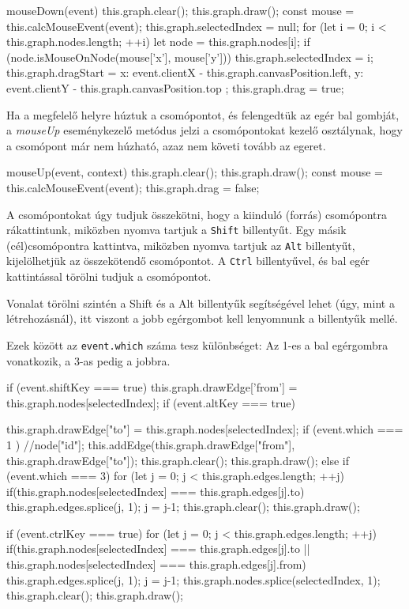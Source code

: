\begin{javascript}
mouseDown(event)
{
   this.graph.clear();
   this.graph.draw();
   const mouse = this.calcMouseEvent(event);
   this.graph.selectedIndex = null;
   for (let i = 0; i < this.graph.nodes.length; ++i) {
       let node = this.graph.nodes[i];
       if (node.isMouseOnNode(mouse['x'], mouse['y'])){
           this.graph.selectedIndex = i;
       }
   }
   this.graph.dragStart = {
       x: event.clientX - this.graph.canvasPosition.left,
       y: event.clientY - this.graph.canvasPosition.top
   };
   this.graph.drag = true;
}
\end{javascript}

 
Ha a megfelelő helyre húztuk a csomópontot, és felengedtük az egér bal gombját, a \textit{mouseUp} eseménykezelő metódus jelzi a csomópontokat kezelő osztálynak, hogy a csomópont már nem húzható, azaz nem követi tovább az egeret.

\begin{javascript}
mouseUp(event, context)
{
   this.graph.clear();
   this.graph.draw();
   const mouse = this.calcMouseEvent(event);
   this.graph.drag = false;
}
\end{javascript}

A csomópontokat úgy tudjuk összekötni, hogy a kiinduló (forrás) csomópontra rákattintunk, miközben nyomva tartjuk a \texttt{Shift} billentyűt. Egy másik (cél)csomópontra kattintva, miközben nyomva tartjuk az \texttt{Alt} billentyűt, kijelölhetjük az összekötendő csomópontot. A \texttt{Ctrl} billentyűvel, és bal egér kattintással törölni tudjuk a csomópontot.

Vonalat törölni szintén a Shift és a Alt billentyűk segítségével lehet (úgy, mint a létrehozásnál), itt viszont a jobb egérgombot kell lenyomnunk a billentyűk mellé.

Ezek között az \texttt{event.which} száma tesz különbséget: Az 1-es a bal egérgombra vonatkozik, a 3-as pedig a jobbra.

\begin{javascript}
if (event.shiftKey === true) {
    this.graph.drawEdge['from'] = this.graph.nodes[selectedIndex];
}
if (event.altKey === true) {
    this.graph.drawEdge["to"] = this.graph.nodes[selectedIndex];
    if (event.which === 1 ){
        //node["id"];
        this.addEdge(this.graph.drawEdge["from"], this.graph.drawEdge["to"]);
        this.graph.clear();
        this.graph.draw();
    } else if (event.which === 3){
        for (let j = 0; j < this.graph.edges.length; ++j) {
            if(this.graph.nodes[selectedIndex] === this.graph.edges[j].to)
            {
                this.graph.edges.splice(j, 1);
                j = j-1;
                this.graph.clear();
                this.graph.draw();
            }
        }
    }

}
if (event.ctrlKey === true) {
    for (let j = 0; j < this.graph.edges.length; ++j) {
        if(this.graph.nodes[selectedIndex] === this.graph.edges[j].to || this.graph.nodes[selectedIndex] === this.graph.edges[j].from)
        {
            this.graph.edges.splice(j, 1);
            j = j-1;
        }
    }
    this.graph.nodes.splice(selectedIndex, 1);
    this.graph.clear();
    this.graph.draw();
}
\end{javascript}

